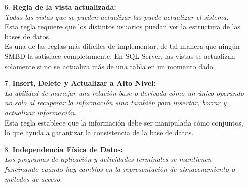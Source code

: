 \documentclass[a4paper, 12pt]{report}
\begin{document}
{\begin{enumerate}
{    \textit{
    Un sistema relacional puede soprtar varios lenguajes de programación y modos
    de uso terminal, pero al menos uno de ellos debe tener expresiones que sean
    expresables por medio de una sitáxis bien definida y puede soportar lo
    siguiente:}
    \begin{itemize}
        \item\textit{{Definición de datos.}}
        \item\textit{{Visibilización de la definición.}}
        \item\textit{{Manipulación de datos}}
        \item\textit{{Restricciones de integridad.}}
        \item\textit{{Autorizaciones.}}
        \item\textit{{Bordes de transacciones (inicio, commit, etc.).}}
    \end{itemize}
    Esta restricción requiere que el sistema tenga un lenguaje que pueda manipular
    (recuperar, insertar, borrar, etc.) la información dentro de la base de datos.
}
\item[6.]{\textbf{Regla de la vista actualizada:}\\
    \textit{Todas las vistas que se pueden actualizar las puede actualizar el
    sistema.}\\
    Esta regla requiere que los distintos usuarios puedan ver la estructura de
    las bases de datos.\\
    Es una de las reglas más difíciles de implementar, de tal manera que ningún
    SMBD la satisface completamente. En SQL Server, las vistas se actualizan
    solamente si no se actualiza más de una tabla en un momento dado.
}
\item[7.]{\textbf{Insert, Delete y Actualizar a Alto Nivel:}\\
    \textit{La abilidad de manejar una relación base o derivada cómo un único
    operando no solo al recuperar la información sino también para insertar,
    borrar y actualizar información.}\\
    Esta regla establece que la información debe ser manipulada cómo conjuntos,
    lo que ayuda a garantizar la consistencia de la base de datos.
}
\item[8.]{\textbf{Independencia Física de Datos:}\\\textit{
    Los programas de aplicación y actividades terminales se mantienen funcinando
    cuándo hay cambios en la representación de almacenamiento o métodos de
    acceso.}\\
}
\end{enumerate}}
\end{document}
